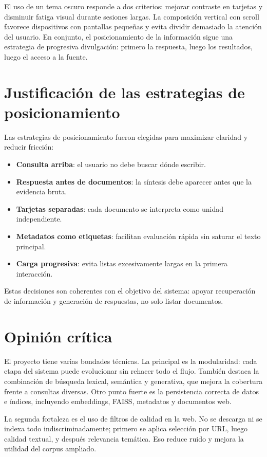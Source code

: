 \documentclass{llncs}
\begin{document}
El uso de un tema oscuro responde a dos criterios: mejorar contraste en tarjetas y disminuir fatiga visual durante sesiones largas. La composición vertical con scroll favorece dispositivos con pantallas pequeñas y evita dividir demasiado la atención del usuario. En conjunto, el posicionamiento de la información sigue una estrategia de progresiva divulgación: primero la respuesta, luego los resultados, luego el acceso a la fuente.

\section{Justificación de las estrategias de posicionamiento}

Las estrategias de posicionamiento fueron elegidas para maximizar claridad y reducir fricción:

\begin{itemize}
    \item \textbf{Consulta arriba}: el usuario no debe buscar dónde escribir.
    \item \textbf{Respuesta antes de documentos}: la síntesis debe aparecer antes que la evidencia bruta.
    \item \textbf{Tarjetas separadas}: cada documento se interpreta como unidad independiente.
    \item \textbf{Metadatos como etiquetas}: facilitan evaluación rápida sin saturar el texto principal.
    \item \textbf{Carga progresiva}: evita listas excesivamente largas en la primera interacción.
\end{itemize}

Estas decisiones son coherentes con el objetivo del sistema: apoyar recuperación de información y generación de respuestas, no solo listar documentos.

\section{Opinión crítica}

El proyecto tiene varias bondades técnicas. La principal es la modularidad: cada etapa del sistema puede evolucionar sin rehacer todo el flujo. También destaca la combinación de búsqueda lexical, semántica y generativa, que mejora la cobertura frente a consultas diversas. Otro punto fuerte es la persistencia correcta de datos e índices, incluyendo embeddings, FAISS, metadatos y documentos web.

La segunda fortaleza es el uso de filtros de calidad en la web. No se descarga ni se indexa todo indiscriminadamente; primero se aplica selección por URL, luego calidad textual, y después relevancia temática. Eso reduce ruido y mejora la utilidad del corpus ampliado.
\end{document}
